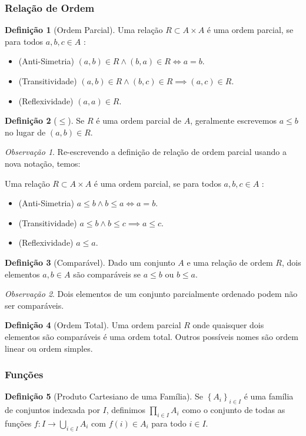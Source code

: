 \documentclass{article}
\theoremstyle{theorem}
\theoremstyle{lemma}
\theoremstyle{definition}
\newtheorem{definicao}{Definição}[section]
\theoremstyle{remark}
\newtheorem{obs}{Observação}[section]
\begin{document}
\subsubsection{Relação de Ordem}
\begin{definicao}[Ordem Parcial]
	Uma relação $R \subset A \times A$ é  uma ordem parcial, se para todos $a,b,c \in A$ :
	\begin{itemize}
		\item (Anti-Simetria) $(a,b) \in R \land (b,a) \in R \iff  a = b$.
		\item (Transitividade)  $(a,b)\in R \land (b,c)\in R \implies (a,c) \in R$.
		\item  (Reflexividade) $(a,a) \in R$.
	\end{itemize}
\end{definicao}
\begin{definicao}[$\leq$]
	Se $R$ é uma ordem parcial de $A$, geralmente escrevemos $a\leq b$ no lugar de  $(a,b) \in R$.
\end{definicao}
\begin{obs}

	Re-escrevendo a definição de relação de ordem parcial usando a nova notação, temos:

	Uma relação $R \subset A \times A$ é uma ordem parcial, se para todos $a,b,c \in A$ :
	\begin{itemize}
		\item (Anti-Simetria) $a \leq b \land b \leq a \iff a = b$.
		\item (Transitividade)  $a \leq b \land b \leq c \implies a \leq c$.
		\item  (Reflexividade) $a \leq a$.
	\end{itemize}
\end{obs}
\begin{definicao}[Comparável]
	Dado um conjunto $A$ e uma relação de ordem $R$, dois elementos $a,b\in A$ são comparáveis se $a\leq b$ ou $b\leq a$.
\end{definicao}
\begin{obs}
	Dois elementos de um conjunto parcialmente ordenado podem não ser comparáveis.
\end{obs}
\begin{definicao}[Ordem Total]
	Uma ordem parcial $R$ onde quaisquer dois elementos são comparáveis é uma ordem total. Outros possíveis nomes são ordem linear ou ordem simples.
\end{definicao}
\subsubsection{Funções}
\begin{definicao}[Produto Cartesiano de uma Família]
	Se $\left\{ A_i \right\}_{i\in I}$ é uma família de conjuntos indexada por $I$, definimos $\displaystyle\prod_{i\in I} A_i$  como o conjunto de todas as funções $f:I \to \displaystyle\bigcup_{i\in I} A_i $  com $f(i) \in A_i$ para todo $i\in I$.
\end{definicao}
\end{document}
